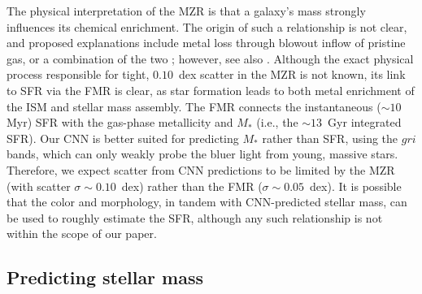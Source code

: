 \documentclass[fleqn,usenatbib]{mnras}
\begin{document}
The physical interpretation of the MZR is that a galaxy's mass strongly influences its chemical enrichment.
The origin of such a relationship is not clear, and proposed explanations include metal loss through blowout \citep[e.g.,][]{2002ApJ...581.1019G,2004ApJ...613..898T} inflow of pristine gas, or a combination of the two \citep[][]{2013ApJ...772..119L}; however, see also \cite{2013A&A...554A..58S}.
Although the exact physical process responsible for tight, $0.10$~dex scatter in the MZR is not known, its link to SFR via the FMR is clear, as star formation leads to both metal enrichment of the ISM and stellar mass assembly.
The FMR connects the instantaneous ($\sim 10$ Myr) SFR with the gas-phase metallicity \citep[$\sim 1$~Gyr timescales; see, e.g.,][]{2011ApJ...734...48L} and $M_{\ast}$ (i.e., the $\sim 13$~Gyr integrated SFR).
Our CNN is better suited for predicting $M_{\ast}$ rather than SFR, using the $gri$ bands, which can only weakly probe the bluer light from young, massive stars.
Therefore, we expect scatter from CNN predictions to be limited by the MZR (with scatter $\sigma \sim 0.10$~dex) rather than the FMR ($\sigma \sim 0.05$~dex).
It is possible that the color and morphology, in tandem with CNN-predicted stellar mass, can be used to roughly estimate the SFR, although any such relationship is not within the scope of our paper.





\subsection{Predicting stellar mass}
\end{document}
